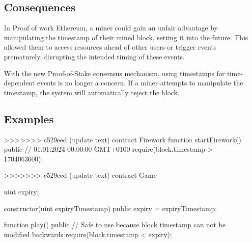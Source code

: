 \subsection{Consequences}


In Proof of work Ethereum, a miner could gain an unfair advantage by
manipulating the timestamp of their mined block, setting it into the future.
This allowed them to access resources ahead of other users or trigger events
prematurely, disrupting the intended timing of these events.

With the new Proof-of-Stake consensus mechanism, using timestamps for
time-dependent events is no longer a concern. If a miner attempts to manipulate
the timestamp, the system will automatically reject the block.

\subsection{Examples}

\begin{solidity}[caption=Vulnerable smart contract during proof-of-work Ethereum]
>>>>>>> c529eed (update text)
contract Firework {
  function startFirework() public {
    // 01.01.2024 00:00:00 GMT+0100
    require(block.timestamp > 1704063600);
  }
}
\end{solidity}

\begin{solidity}[caption=Non Vulnerable smart contract during proof-of-work Ethereum]
>>>>>>> c529eed (update text)
contract Game {
  uint expiry;

  constructor(uint expiryTimestamp) public {
    expiry = expiryTimestamp;
  }

  function play() public {
    // Safe to use because block timestamp can not be modified backwards
    require(block.timestamp < expiry);
  }
}
\end{solidity}

    
